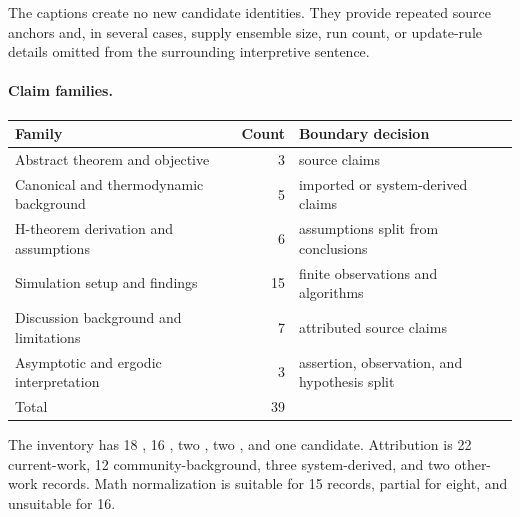 The captions create no new candidate identities. They provide repeated source anchors and, in several cases, supply ensemble size, run count, or update-rule details omitted from the surrounding interpretive sentence.

\paragraph{Claim families.}
\begin{center}
\begin{tabular}{lrl}
\toprule
Family & Count & Boundary decision \\
\midrule
Abstract theorem and objective & 3 & source claims \\
Canonical and thermodynamic background & 5 & imported or system-derived claims \\
H-theorem derivation and assumptions & 6 & assumptions split from conclusions \\
Simulation setup and findings & 15 & finite observations and algorithms \\
Discussion background and limitations & 7 & attributed source claims \\
Asymptotic and ergodic interpretation & 3 & assertion, observation, and hypothesis split \\
\midrule
Total & 39 & \\
\bottomrule
\end{tabular}
\end{center}

The inventory has 18 , 16 , two , two , and one  candidate. Attribution is 22 current-work, 12 community-background, three system-derived, and two other-work records. Math normalization is suitable for 15 records, partial for eight, and unsuitable for 16.


